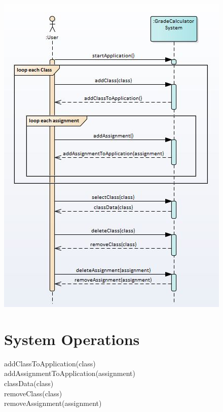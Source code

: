\documentclass[12pt]{article}
\begin{document}
\includegraphics[width=\textwidth]{SystemSequenceDiagram}

\newpage

\section*{System Operations}

\noindent
addClassToApplication(class) \\

\noindent
addAssignmentToApplication(assignment)  \\

\noindent
classData(class) \\

\noindent
removeClass(class) \\

\noindent
removeAssignment(assignment) \\
\end{document}
